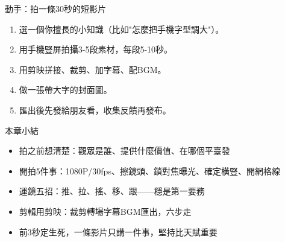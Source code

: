 \begin{tcbpractice}{動手：拍一條30秒的短影片}
\begin{enumerate}
  \item 選一個你擅長的小知識（比如"怎麼把手機字型調大"）。
  \item 用手機豎屏拍攝3-5段素材，每段5-10秒。
  \item 用剪映拼接、裁剪、加字幕、配BGM。
  \item 做一張帶大字的封面圖。
  \item 匯出後先發給朋友看，收集反饋再發布。
\end{enumerate}

\end{tcbpractice}

\begin{tcbsummary}{本章小結}
\begin{itemize}
  \item 拍之前想清楚：觀眾是誰、提供什麼價值、在哪個平臺發
  \item 開拍5件事：1080P/30fps、擦鏡頭、鎖對焦曝光、確定橫豎、開網格線
  \item 運鏡五招：推、拉、搖、移、跟——穩是第一要務
  \item 剪輯用剪映：裁剪轉場字幕BGM匯出，六步走
  \item 前3秒定生死，一條影片只講一件事，堅持比天賦重要
\end{itemize}

\end{tcbsummary}

